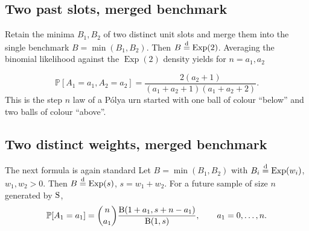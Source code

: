 \documentclass[11pt]{article}
\newcommand{\PP}{\mathbb{P}}
\DeclareMathOperator{\Exp}{Exp}
\theoremstyle{plain}
\theoremstyle{definition}
\begin{document}
\subsection{Two past slots, merged benchmark}
\label{sec:two-slots}
 
Retain the minima \(B_1,B_2\) of two distinct unit slots and merge them into the single benchmark \(B=\min(B_1,B_2)\). Then \(B\stackrel{\rm d}{=}\Exp(2)\). Averaging the binomial likelihood against the \(\Exp(2)\) density yields
for $n=a_1, a_2$

\begin{equation}
\label{eq:merged-unit}
\PP[A_1=a_1,A_2=a_2]=\frac{2(a_2+1)}{(a_1+a_2+1)(a_1+a_2+2)}.
\end{equation}
This is the step $n$ law of a P\'olya urn started with one ball of colour ``below'' and two balls of colour ``above''.
\subsection{Two distinct weights, merged benchmark}
The next formula  is again standard
Let \(B=\min(B_1,B_2)\) with \(B_i\stackrel{\rm d}{=}\Exp(w_i)\), \(w_1,w_2>0\). Then \(B\stackrel{\rm d}{=}\Exp(s)\), \(s=w_1+w_2\). For a future sample of size \(n\) generated by \({\rm S}\),
\begin{equation}
\label{eq:merged-weighted}
\PP[A_1=a_1]=\binom{n}{a_1}\frac{{\rm B}(1+a_1,s+n-a_1)}{{\rm B}(1,s)},\qquad a_1=0,\dots,n.
\end{equation}

 
 
\end{document}
